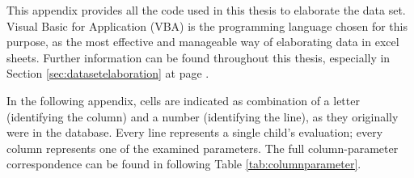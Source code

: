 \label{chap:appendixvbaexpressions}
This appendix provides all the code used in this thesis to elaborate the data set. Visual Basic for Application (VBA) is the programming language chosen for this purpose, as the most effective and manageable way of elaborating data in excel sheets. Further information can be found throughout this thesis, especially in Section \ref{sec:datasetelaboration} at page \pageref{sec:datasetelaboration}.

In the following appendix, cells are indicated as combination of a letter (identifying the column) and a number (identifying the line), as they originally were in the database. Every line represents a single child's evaluation; every column represents one of the examined parameters. The full column-parameter correspondence can be found in following Table \ref{tab:columnparameter}.

\newlength\mylength
\setlength\mylength{\dimexpr\textwidth-5\arrayrulewidth-8\tabcolsep}

